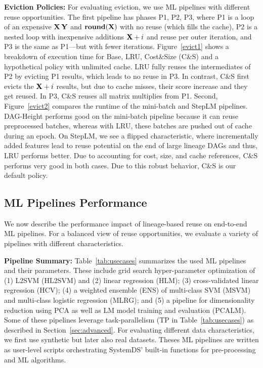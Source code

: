 \textbf{Eviction Policies:} For evaluating eviction, we use ML pipelines with different reuse opportunities. The first pipeline has phases P1, P2, P3, where P1 is a loop of an expensive $\mathbf{X}\,\mathbf{Y}$ and $\textbf{round}(\mathbf{X})$ with no reuse (which fills the cache), P2 is a nested loop with inexpensive additions $\mathbf{X} + i$ and reuse per outer iteration, and P3 is the same as P1---but with fewer iterations. Figure~\ref{evict1} shows a breakdown of execution time for Base, LRU, Cost\&Size (C\&S) and a hypothetical policy with unlimited cache. LRU fully reuses the intermediates of P2 by evicting P1 results, which leads to no reuse in P3. In contrast, C\&S first evicts the $\mathbf{X} + i$ results, but due to cache misses, their score increase and they get reused. In P3, C\&S reuses all matrix multiplies from P1. Second, Figure~\ref{evict2} compares the runtime of the mini-batch and StepLM pipelines. DAG-Height performs good on the mini-batch pipeline because it can reuse preprocessed batches, whereas with LRU, these batches are pushed out of cache during an epoch. On StepLM, we see a flipped characteristic, where incrementally added features lead to reuse potential on the end of large lineage DAGs and thus, LRU performs better. Due to accounting for cost, size, and cache references, C\&S performs very good in both cases. Due to this robust behavior, C\&S is our default policy.

\subsection{ML Pipelines Performance}
\label{sec:pipe}

We now describe the performance impact of lineage-based reuse on end-to-end ML pipelines. For a balanced view of reuse opportunities, we evaluate a variety of pipelines with different characteristics.

\textbf{Pipeline Summary:} Table~\ref{tab:usecases} summarizes the used ML pipelines and their parameters. These include grid search hyper-parameter optimization of (1) L2SVM (HL2SVM) and (2) linear regression (HLM); (3) cross-validated linear regression (HCV); (4) a weighted ensemble (ENS) of multi-class SVM (MSVM) and multi-class logistic regression (MLRG); and (5) a pipeline for dimensionality reduction using PCA as well as LM model training and evaluation (PCALM). Some of these pipelines leverage task-parallelism (TP in Table~\ref{tab:usecases}) as described in Section~\ref{sec:advanced}. For evaluating different data characteristics, we first use synthetic but later also real datasets. Theses ML pipelines are written as user-level scripts orchestrating SystemDS' built-in functions for pre-processing and ML algorithms.

